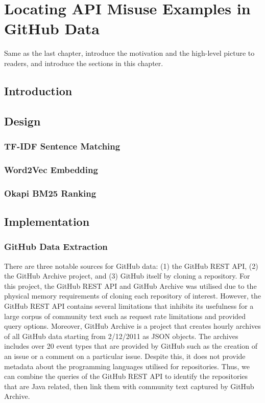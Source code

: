 \chapter{Locating API Misuse Examples in GitHub Data}
\label{cha:infoRetrieval}
Same as the last chapter, introduce the motivation and the high-level picture to
readers, and introduce the sections in this chapter.

\section{Introduction}
\label{sec:info-intro}

\section{Design}
\label{sec:info-design}
\subsection{TF-IDF Sentence Matching}
\label{subsec:info-tfidf}

\subsection{Word2Vec Embedding}
\label{subsec:info-w2v}

\subsection{Okapi BM25 Ranking}
\label{subsec:info-bm25}

\section{Implementation}
\label{sec:info-implement}

\subsection{GitHub Data Extraction}
\label{subsec:info-github-extract}
There are three notable sources for GitHub data: (1) the GitHub REST API, (2) the GitHub Archive project, and (3) GitHub itself by cloning a repository. For this project, the GitHub REST API and GitHub Archive was utilised due to the physical memory requirements of cloning each repository of interest. However, the GitHub REST API contains several limitations that inhibits its usefulness for a large corpus of community text such as request rate limitations and provided query options. Moreover, GitHub Archive is a project that creates hourly archives of all GitHub data starting from 2/12/2011 as JSON objects. The archives includes over 20 event types that are provided by GitHub such as the creation of an issue or a comment on a particular issue. Despite this, it does not provide metadata about the programming languages utilised for repositories. Thus, we can combine the queries of the GitHub REST API to identify the repositories that are Java related, then link them with community text captured by GitHub Archive.\\ 

